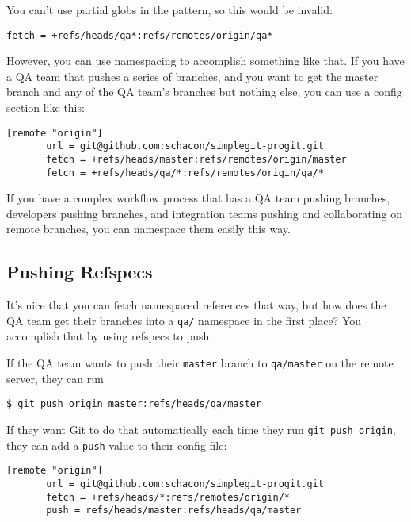 \documentclass[a4paper]{book}
\begin{document}
You can't use partial globs in the pattern, so this would be invalid:

\begin{shaded}\begin{verbatim}
fetch = +refs/heads/qa*:refs/remotes/origin/qa*
\end{verbatim}\end{shaded}

However, you can use namespacing to accomplish something like that. If you have a QA team that pushes a series of branches, and you want to get the master branch and any of the QA team's branches but nothing else, you can use a config section like this:

\begin{shaded}\begin{verbatim}
[remote "origin"]
       url = git@github.com:schacon/simplegit-progit.git
       fetch = +refs/heads/master:refs/remotes/origin/master
       fetch = +refs/heads/qa/*:refs/remotes/origin/qa/*
\end{verbatim}\end{shaded}

If you have a complex workflow process that has a QA team pushing branches, developers pushing branches, and integration teams pushing and collaborating on remote branches, you can namespace them easily this way.

\subsection{Pushing Refspecs}

It's nice that you can fetch namespaced references that way, but how does the QA team get their branches into a \texttt{qa/} namespace in the first place? You accomplish that by using refspecs to push.

If the QA team wants to push their \texttt{master} branch to \texttt{qa/master} on the remote server, they can run

\begin{shaded}\begin{verbatim}
$ git push origin master:refs/heads/qa/master
\end{verbatim}\end{shaded}

If they want Git to do that automatically each time they run \texttt{git push origin}, they can add a \texttt{push} value to their config file:

\begin{shaded}\begin{verbatim}
[remote "origin"]
       url = git@github.com:schacon/simplegit-progit.git
       fetch = +refs/heads/*:refs/remotes/origin/*
       push = refs/heads/master:refs/heads/qa/master
\end{verbatim}\end{shaded}
\end{document}
